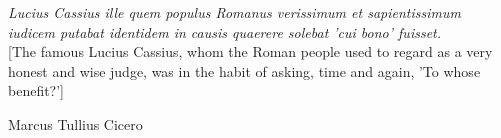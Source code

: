 
\begin{vplace}[0.25]
  \epigraph{\textit{Lucius Cassius ille quem populus Romanus verissimum et sapientissimum iudicem putabat identidem in causis quaerere solebat 'cui bono' fuisset.\\} [The famous Lucius Cassius, whom the Roman people used to regard as a very honest and wise judge, was in the habit of asking, time and again, 'To whose benefit?']}{Marcus Tullius Cicero}
\end{vplace}

